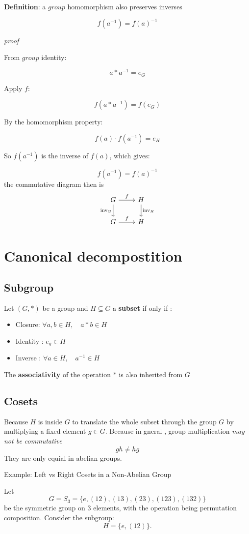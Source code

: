 \documentclass[12pt]{article}
\begin{document}
\textbf{Definition}: a $group$ homomorphism also preserves inverses

$$
f(a^{-1}) = f(a)^{-1}
$$

\textit{proof}

From $group$ identity: 

$$
a * a^{-1} = e_G
$$

Apply $f$:

$$
f(a * a^{-1}) = f(e_G)
$$

By the homomorphism property:

$$
f(a) \cdot f(a^{-1}) = e_H
$$

So $f(a^{-1})$ is the inverse of $f(a)$, which gives:

$$
f(a^{-1}) = f(a)^{-1}
$$
the commutative diagram then is 
$$
\begin{tikzcd}
	G \arrow[r, "f"] \arrow[d, "\mathrm{inv}_G"'] & H \arrow[d, "\mathrm{inv}_H"] \\
	G \arrow[r, "f"] & H
\end{tikzcd}
$$

\section*{Canonical decompostition}
\subsection*{Subgroup}
Let $(G,*)$ be a group and $H \subseteq G$ a \textbf{subset} if only if :
\begin{itemize}
	\item Closure: $\forall a,b \in H, \quad a*b \in H$
	\item Identity : $e_g \in H$
	\item Inverse : $\forall a \in H, \quad a^{-1} \in H$
\end{itemize}
The \textbf{associativity} of the operation $*$ is also inherited from $G$
\subsection*{Cosets}
Because $H$ is inside $G$ to translate the whole subset through the group $G$ by multiplying a fixed element $g \in G$. Because in gneral , group multiplication \textit{may not be commutative} 
$$
gh \neq hg
$$
They are only equial in abelian groups.


Example: Left vs Right Cosets in a Non-Abelian Group

Let  
$$
G = S_3 = \{ e, (12), (13), (23), (123), (132) \}
$$
be the symmetric group on 3 elements, with the operation being permutation composition.  
Consider the subgroup:  
$$
H = \{ e, (12) \}.
$$
\end{document}
